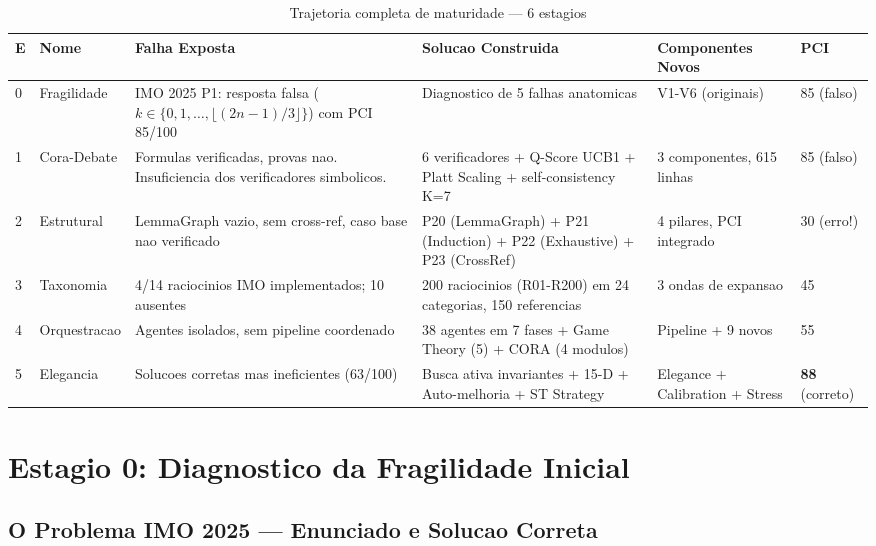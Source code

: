 \documentclass[5p]{elsarticle}
\begin{document}
\begin{landscape}
\begin{table}[H]
  \centering
  \caption{Trajetoria completa de maturidade — 6 estagios}
  \label{tab:stages}
  \small
  \begin{tabular}{p{0.5cm}p{2cm}p{3cm}p{3.5cm}p{3cm}p{2.5cm}}
    \toprule
    \textbf{E} & \textbf{Nome} & \textbf{Falha Exposta} & \textbf{Solucao Construida} & \textbf{Componentes Novos} & \textbf{PCI} \\
    \midrule
    0 & Fragilidade & IMO 2025 P1: resposta falsa ($k\in\{0,1,\dots,\lfloor(2n-1)/3\rfloor\}$) com PCI 85/100 & Diagnostico de 5 falhas anatomicas & V1-V6 (originais) & 85 (falso) \\
    \rowcolor{redbg}
    1 & Cora-Debate & Formulas verificadas, provas nao. Insuficiencia dos verificadores simbolicos. & 6 verificadores + Q-Score UCB1 + Platt Scaling + self-consistency K=7 & 3 componentes, 615 linhas & 85 (falso) \\
    2 & Estrutural & LemmaGraph vazio, sem cross-ref, caso base nao verificado & P20 (LemmaGraph) + P21 (Induction) + P22 (Exhaustive) + P23 (CrossRef) & 4 pilares, PCI integrado & 30 (erro!) \\
    \rowcolor{yellowbg}
    3 & Taxonomia & 4/14 raciocinios IMO implementados; 10 ausentes & 200 raciocinios (R01-R200) em 24 categorias, 150 referencias & 3 ondas de expansao & 45 \\
    4 & Orquestracao & Agentes isolados, sem pipeline coordenado & 38 agentes em 7 fases + Game Theory (5) + CORA (4 modulos) & Pipeline + 9 novos & 55 \\
    \rowcolor{greenbg}
    5 & Elegancia & Solucoes corretas mas ineficientes (63/100) & Busca ativa invariantes + 15-D + Auto-melhoria + ST Strategy & Elegance + Calibration + Stress & \textbf{88} (correto) \\
    \bottomrule
  \end{tabular}
\end{table}
\end{landscape}

\section{Estagio 0: Diagnostico da Fragilidade Inicial}

\subsection{O Problema IMO 2025 — Enunciado e Solucao Correta}
\end{document}
